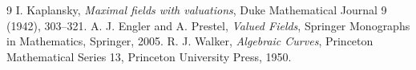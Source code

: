 \documentclass[11pt,uplatex,dvipdfmx]{jsarticle}
\theoremstyle{proofnote}
\begin{document}
\begin{thebibliography}{9}
  I. Kaplansky, \emph{Maximal fields with valuations},
  Duke Mathematical Journal 9 (1942), 303--321.
  A. J. Engler and A. Prestel, \emph{Valued Fields},
  Springer Monographs in Mathematics, Springer, 2005.
  R. J. Walker, \emph{Algebraic Curves},
  Princeton Mathematical Series 13, Princeton University Press, 1950.
\end{thebibliography}
\end{document}
